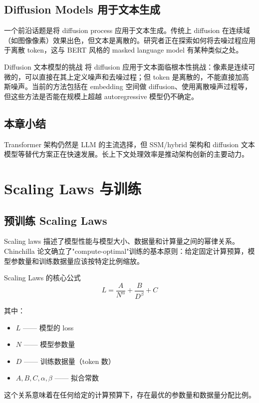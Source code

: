 \documentclass[a4paper]{article}
\begin{document}
\subsection{Diffusion Models 用于文本生成}

一个前沿话题是将 diffusion process 应用于文本生成。传统上 diffusion 在连续域（如图像像素）效果出色，但文本是离散的。研究者正在探索如何将去噪过程应用于离散 token，这与 BERT 风格的 masked language model 有某种类似之处。

\begin{warningbox}{Diffusion 文本模型的挑战}
将 diffusion 应用于文本面临根本性挑战：像素是连续可微的，可以直接在其上定义噪声和去噪过程；但 token 是离散的，不能直接加高斯噪声。当前的方法包括在 embedding 空间做 diffusion、使用离散噪声过程等，但这些方法是否能在规模上超越 autoregressive 模型仍不确定。
\end{warningbox}

\subsection{本章小结}

Transformer 架构仍然是 LLM 的主流选择，但 SSM/hybrid 架构和 diffusion 文本模型等替代方案正在快速发展。长上下文处理效率是推动架构创新的主要动力。

\section{Scaling Laws 与训练}

\subsection{预训练 Scaling Laws}

Scaling laws 描述了模型性能与模型大小、数据量和计算量之间的幂律关系。Chinchilla 论文确立了"compute-optimal"训练的基本原则：给定固定计算预算，模型参数量和训练数据量应该按特定比例缩放。

\begin{importantbox}{Scaling Laws 的核心公式}
$$L = \frac{A}{N^{\alpha}} + \frac{B}{D^{\beta}} + C$$

其中：
\begin{itemize}
    \item $L$ —— 模型的 loss
    \item $N$ —— 模型参数量
    \item $D$ —— 训练数据量（token 数）
    \item $A, B, C, \alpha, \beta$ —— 拟合常数
\end{itemize}
这个关系意味着在任何给定的计算预算下，存在最优的参数量和数据量分配比例。
\end{importantbox}
\end{document}
